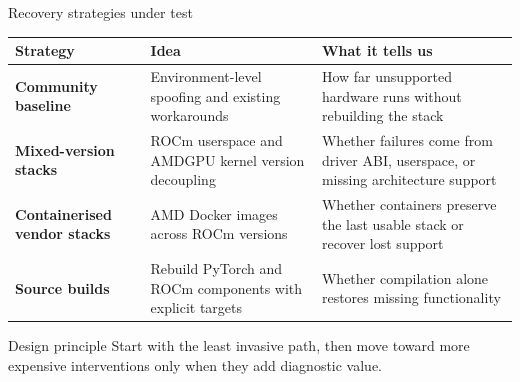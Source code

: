 \documentclass[aspectratio=169,11pt]{beamer}
\begin{document}
\begin{frame}{Recovery strategies under test}
    \small
    \begin{tabularx}{\textwidth}{>{\bfseries}p{3.1cm}X p{4.1cm}}
        \toprule
        Strategy & Idea & What it tells us \\
        \midrule
        Community baseline & Environment-level spoofing and existing workarounds & How far unsupported hardware runs without rebuilding the stack \\
        Mixed-version stacks & ROCm userspace and AMDGPU kernel version decoupling & Whether failures come from driver ABI, userspace, or missing architecture support \\
        Containerised vendor stacks & AMD Docker images across ROCm versions & Whether containers preserve the last usable stack or recover lost support \\
        Source builds & Rebuild PyTorch and ROCm components with explicit targets & Whether compilation alone restores missing functionality \\
        \bottomrule
    \end{tabularx}

    \vspace{0.35cm}
    \begin{alertblock}{Design principle}
        Start with the least invasive path, then move toward more expensive interventions only when they add diagnostic value.
    \end{alertblock}
\end{frame}
\end{document}
